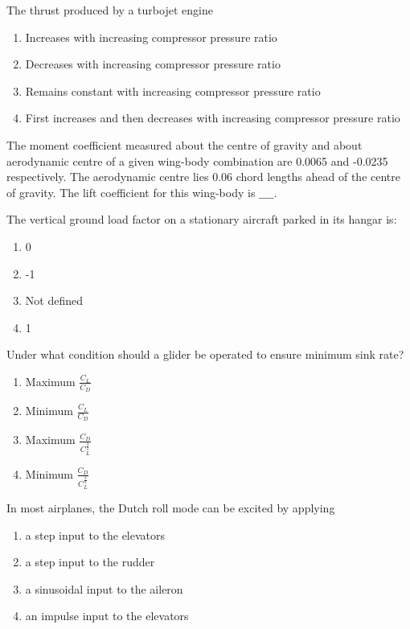 \item The thrust produced by a turbojet engine
 \begin{enumerate}
     \item Increases with increasing compressor pressure ratio
     \item Decreases with increasing compressor pressure ratio
     \item Remains constant with increasing compressor pressure ratio
     \item First increases and then decreases with increasing compressor pressure ratio \\
 \end{enumerate}
\item The moment coefficient measured about the centre of gravity and about aerodynamic centre of a given wing-body combination are 0.0065 and -0.0235 respectively. The aerodynamic centre lies 0.06 chord lengths ahead of the centre of gravity. The lift coefficient for this wing-body is $\_\_\_\_$. \\
\item The vertical ground load factor on a stationary aircraft parked in its hangar is:
\begin{enumerate}
    \item 0
    \item -1
    \item Not defined
    \item 1 \\
\end{enumerate}
\item Under what condition should a glider be operated to ensure minimum sink rate?
\begin{enumerate}
    \item Maximum $\frac{C_L}{C_D}$
    \item Minimum $\frac{C_L}{C_D}$
    \item Maximum $\frac{C_D}{C_L^\frac{3}{2}}$
    \item Minimum $\frac{C_D}{C_L^\frac{3}{2}}$ \\
 \end{enumerate}
\item In most airplanes, the Dutch roll mode can be excited by applying
 \begin{enumerate}
    \item a step input to the elevators
    \item a step input to the rudder
    \item a sinusoidal input to the aileron
    \item an impulse input to the elevators \\
 \end{enumerate}

